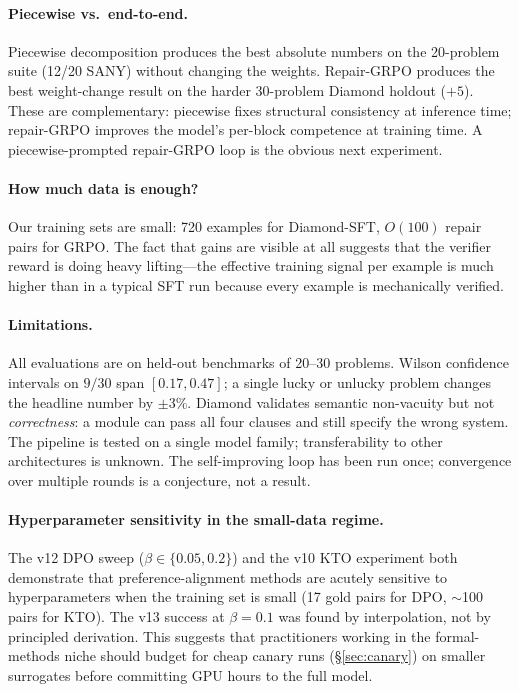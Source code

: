\documentclass[11pt]{article}
\begin{document}
\paragraph{Piecewise vs.\ end-to-end.}
Piecewise decomposition produces the best absolute numbers on the
20-problem suite (12/20 SANY) without changing the weights.
Repair-GRPO produces the best weight-change result on the harder
30-problem Diamond holdout ($+5$).  These are complementary:
piecewise fixes structural consistency at inference time; repair-GRPO
improves the model's per-block competence at training time.  A
piecewise-prompted repair-GRPO loop is the obvious next experiment.

\paragraph{How much data is enough?}
Our training sets are small: 720 examples for Diamond-SFT, $O(100)$
repair pairs for GRPO.  The fact that gains are visible at all
suggests that the verifier reward is doing heavy lifting---the
effective training signal per example is much higher than in a
typical SFT run because every example is mechanically verified.

\paragraph{Limitations.}
All evaluations are on held-out benchmarks of 20--30 problems.
Wilson confidence intervals on $9/30$ span $[0.17, 0.47]$; a single
lucky or unlucky problem changes the headline number by
$\pm 3$\%.  Diamond validates semantic non-vacuity but not
\emph{correctness}: a module can pass all four clauses and still
specify the wrong system.  The pipeline is tested on a single model
family; transferability to other architectures is unknown.  The
self-improving loop has been run once; convergence over multiple
rounds is a conjecture, not a result.

\paragraph{Hyperparameter sensitivity in the small-data regime.}
The v12 DPO sweep ($\beta \in \{0.05, 0.2\}$) and the v10 KTO
experiment both demonstrate that preference-alignment methods are
acutely sensitive to hyperparameters when the training set is small
(17 gold pairs for DPO, $\sim$100 pairs for KTO).  The v13 success
at $\beta = 0.1$ was found by interpolation, not by principled
derivation.  This suggests that practitioners working in the
formal-methods niche should budget for cheap canary runs
(\S\ref{sec:canary}) on smaller surrogates before committing GPU hours
to the full model.
\end{document}
